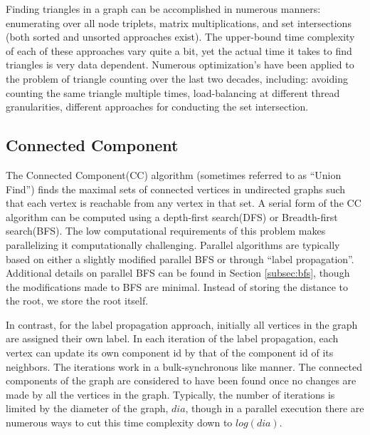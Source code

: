 Finding triangles in a graph can be accomplished in numerous manners: enumerating over all node triplets, matrix multiplications, and set intersections (both sorted and unsorted approaches exist). The upper-bound time complexity of each of these approaches vary quite a bit, yet the actual time it takes to find triangles is very data dependent. Numerous optimization's have been applied to the problem of triangle counting over the last two decades, including: avoiding counting the same triangle multiple times, load-balancing at different thread granularities, different approaches for conducting the set intersection. 





\subsection{Connected Component}
The Connected Component(CC) algorithm (sometimes referred to as  ``Union Find'') finds the maximal sets of connected vertices in undirected graphs such that each vertex is reachable from any vertex in that set. A serial form of the CC algorithm can be computed using a depth-first search(DFS) or Breadth-first search(BFS). The low computational requirements of this problem makes parallelizing it computationally challenging. Parallel algorithms are typically based on either a slightly modified parallel BFS or through ``label propagation''. Additional details on parallel BFS can be found in Section \ref{subsec:bfs}, though the modifications made to BFS are minimal. Instead of storing the distance to the root, we store the root itself.  

In contrast, for the label propagation approach, initially all vertices in the graph are assigned their own label. In each iteration of the label propagation, each vertex can update its own component id by that of the component id of its neighbors. The iterations work in a bulk-synchronous like manner. The connected components of the graph are considered to have been found once no changes are made by all the vertices in the graph. Typically, the number of iterations is limited by the diameter of the graph, $dia$, though in a parallel execution there are numerous ways to cut this time complexity down to $log(dia)$.

